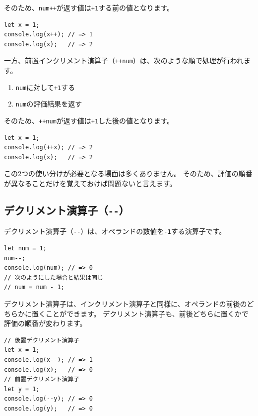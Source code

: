 そのため、\texttt{num++}が返す値は\texttt{+1}する前の値となります。

\begin{lstlisting}
let x = 1;
console.log(x++); // => 1
console.log(x);   // => 2
\end{lstlisting}

一方、前置インクリメント演算子（\texttt{++num}）は、次のような順で処理が行われます。

\begin{enumerate}
\def\labelenumi{\arabic{enumi}.}
\item
  \texttt{num}に対して\texttt{+1}する
\item
  \texttt{num}の評価結果を返す
\end{enumerate}

そのため、\texttt{++num}が返す値は\texttt{+1}した後の値となります。

\begin{lstlisting}
let x = 1;
console.log(++x); // => 2
console.log(x);   // => 2
\end{lstlisting}

この2つの使い分けが必要となる場面は多くありません。
そのため、評価の順番が異なることだけを覚えておけば問題ないと言えます。

\hypertarget{decrement-operator}{%
\subsection{\texorpdfstring{デクリメント演算子（\texttt{-\/-}）}{デクリメント演算子（-\/-）}}\label{decrement-operator}}

デクリメント演算子（\texttt{-\/-}）は、オペランドの数値を\texttt{-1}する演算子です。

\begin{lstlisting}
let num = 1;
num--;
console.log(num); // => 0
// 次のようにした場合と結果は同じ
// num = num - 1;
\end{lstlisting}

デクリメント演算子は、インクリメント演算子と同様に、オペランドの前後のどちらかに置くことができます。
デクリメント演算子も、前後どちらに置くかで評価の順番が変わります。

\begin{lstlisting}
// 後置デクリメント演算子
let x = 1;
console.log(x--); // => 1
console.log(x);   // => 0
// 前置デクリメント演算子
let y = 1;
console.log(--y); // => 0
console.log(y);   // => 0
\end{lstlisting}


